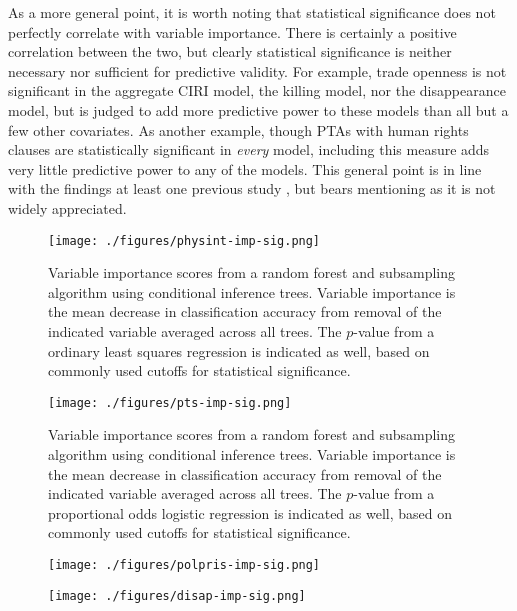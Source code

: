 \documentclass[12pt]{article}
\begin{document}
As a more general point, it is worth noting that statistical significance does not perfectly correlate with variable importance. There is certainly a positive correlation between the two, but clearly statistical significance is neither necessary nor sufficient for predictive validity. For example, trade openness is not significant in the aggregate CIRI model, the killing model, nor the disappearance model, but is judged to add more predictive power to these models than all but a few other covariates. As another example, though PTAs with human rights clauses are statistically significant in {\em every}  model, including this measure adds very little predictive power to any of the models. This general point is in line with the findings at least one previous study \citep{Wardetal2010}, but bears mentioning as it is not widely appreciated. 

\begin{figure}[!htpb]
\centering
\texttt{[image: ./figures/physint-imp-sig.png]}
\caption{Variable importance scores from a random forest and subsampling algorithm using conditional inference trees. Variable importance is the mean decrease in classification accuracy from removal of the indicated variable averaged across all trees. The $p$-value from a ordinary least squares regression is indicated as well, based on commonly used cutoffs for statistical significance.}
\label{physint-imp}
\end{figure}

\begin{figure}[!htpb]
\centering
\texttt{[image: ./figures/pts-imp-sig.png]}
\caption{Variable importance scores from a random forest and subsampling algorithm using conditional inference trees. Variable importance is the mean decrease in classification accuracy from removal of the indicated variable averaged across all trees. The $p$-value from a proportional odds logistic regression is indicated as well, based on commonly used cutoffs for statistical significance.}
\label{pts-imp}
\end{figure}

\begin{figure}[!htpb]
\centering
\texttt{[image: ./figures/polpris-imp-sig.png]}
\caption{}
\label{polpris-imp}
\end{figure}

\begin{figure}[!htpb]
\centering
\texttt{[image: ./figures/disap-imp-sig.png]}
\caption{}
\label{disap-imp}
\end{figure}
\end{document}
